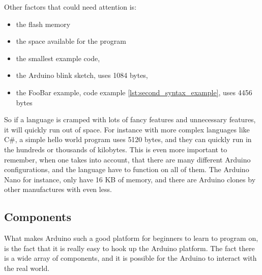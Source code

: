 Other factors that could need attention is: 
\begin{itemize}
\item the flash memory 
\item the space available for the program 
\item the smallest example code, 
\item the Arduino blink sketch, uses 1084 bytes, 
\item the FooBar example, code example \ref{lst:second_syntax_example}, uses 4456 bytes 
\end{itemize}

So if a language is cramped with lots of fancy features and unnecessary features, it will quickly run out of space. For instance with more complex languages like C\#, a simple hello world program uses 5120 bytes, and they can quickly run in the hundreds or thousands of kilobytes. This is even more important to remember, when one takes into account, that there are many different Arduino configurations, and the language have to function on all of them. The Arduino Nano for instance, only have 16 KB of memory, and there are Arduino clones by other manufactures with even less.  

\subsection*{Components}
What makes Arduino such a good platform for beginners to learn to program on, is the fact that it is really easy to hook up the Arduino platform. The fact there is a wide array of components, and it is possible for the Arduino to interact with the real world.

